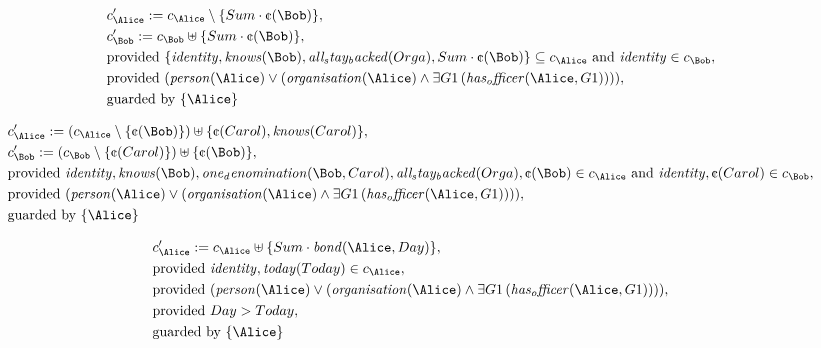 \begin{align*}
&
c'_
{
\Alice
}
 := 
c_
{
\Alice
}
 \setminus 
\{
Sum
\cdot
\text{\textcent}
(
\Bob
)
\}
,\\
&
c'_
{
\Bob
}
 := 
c_
{
\Bob
}
 \uplus 
\{
Sum
\cdot
\text{\textcent}
(
\Bob
)
\}
,\\
&
\text{provided } 
\{
\mathit{
identity
}
,
\mathit{
knows
}
(
\Bob
)
,
\mathit{
all_stay_backed
}
(
Orga
)
,
Sum
\cdot
\text{\textcent}
(
\Bob
)
\}
 \subseteq c_
{
\Alice
}
 \text{ and } 
\mathit{
identity
}
 \in c_
{
\Bob
}
,\\
&
\text{provided } 
(
\mathit{
person
}
(
\Alice
)
\lor
(
\mathit{
organisation
}
(
\Alice
)
\land
\exists 
G1
\,(
\mathit{
has_officer
}
(
\Alice
,
G1
)
)
)
)
,\\
&
\text{guarded by } \{
\Alice
\}
\end{align*}

\begin{align*}
&
c'_
{
\Alice
}
 := 
(c_
{
\Alice
}
 \setminus 
\{
\text{\textcent}
(
\Bob
)
\}
) \uplus 
\{
\text{\textcent}
(
Carol
)
,
\mathit{
knows
}
(
Carol
)
\}
,\\
&
c'_
{
\Bob
}
 := 
(c_
{
\Bob
}
 \setminus 
\{
\text{\textcent}
(
Carol
)
\}
) \uplus 
\{
\text{\textcent}
(
\Bob
)
\}
,\\
&
\text{provided } 
\mathit{
identity
}
,
\mathit{
knows
}
(
\Bob
)
,
\mathit{
one_denomination
}
(
\Bob
,
Carol
)
,
\mathit{
all_stay_backed
}
(
Orga
)
,
\text{\textcent}
(
\Bob
)
 \in c_
{
\Alice
}
 \text{ and } 
\mathit{
identity
}
,
\text{\textcent}
(
Carol
)
 \in c_
{
\Bob
}
,\\
&
\text{provided } 
(
\mathit{
person
}
(
\Alice
)
\lor
(
\mathit{
organisation
}
(
\Alice
)
\land
\exists 
G1
\,(
\mathit{
has_officer
}
(
\Alice
,
G1
)
)
)
)
,\\
&
\text{guarded by } \{
\Alice
\}
\end{align*}

\begin{align*}
&
c'_
{
\Alice
}
 := 
c_
{
\Alice
}
 \uplus 
\{
Sum
\cdot
\mathit{
bond
}
(
\Alice
,
Day
)
\}
,\\
&
\text{provided } 
\mathit{
identity
}
,
\mathit{
today
}
(
Today
)
 \in c_
{
\Alice
}
,\\
&
\text{provided } 
(
\mathit{
person
}
(
\Alice
)
\lor
(
\mathit{
organisation
}
(
\Alice
)
\land
\exists 
G1
\,(
\mathit{
has_officer
}
(
\Alice
,
G1
)
)
)
)
,\\
&
\text{provided } 
Day
>
Today
,\\
&
\text{guarded by } \{
\Alice
\}
\end{align*}
